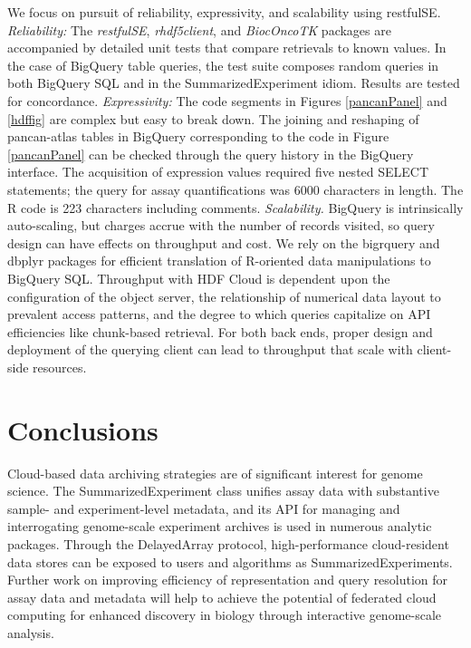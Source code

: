 \documentclass[applications]{gen-bioinformatics}
\newcommand{\Rpackage}[1]{{\textit{#1}}}
\begin{document}
We focus on pursuit of reliability,
expressivity, and scalability using restfulSE.  
\textit{Reliability:} 
The \Rpackage{restfulSE}, \Rpackage{rhdf5client},
and \Rpackage{BiocOncoTK} packages are accompanied by detailed unit
tests that compare retrievals to known values.  In the
case of BigQuery table queries, the test
suite composes random queries 
in both BigQuery SQL and in the SummarizedExperiment idiom.  Results
are tested for concordance.  \textit{Expressivity:} The code
segments in Figures \ref{pancanPanel} and \ref{hdffig} are
complex but easy to break down.  The joining and
reshaping of pancan-atlas tables in BigQuery corresponding
to the code in Figure \ref{pancanPanel}
can be checked through the query history in the BigQuery
interface.  The acquisition of expression values required
five nested SELECT statements; the query for assay quantifications
was 6000 characters in length.
The R code is 223 characters including comments.
\textit{Scalability.}  BigQuery is intrinsically auto-scaling,
but charges accrue with the number of records visited, 
so query design can have effects on throughput
and cost.  We rely on the bigrquery and dbplyr packages for
efficient translation of R-oriented data manipulations to 
BigQuery SQL.  Throughput with HDF Cloud 
is dependent upon the configuration of the object server,
the relationship of numerical data layout to prevalent access
patterns, and the degree to which queries capitalize on
API efficiencies like chunk-based retrieval.  For both
back ends, proper design and deployment of the querying client can
lead to throughput that scale with client-side resources.

\section*{Conclusions}

Cloud-based data archiving strategies are of significant
interest for genome science.  The SummarizedExperiment class
unifies assay data with substantive sample- and experiment-level
metadata, and its API for managing and interrogating
genome-scale experiment archives is used in numerous
analytic packages.  Through the DelayedArray protocol, high-performance
cloud-resident data stores can be exposed to users and
algorithms as SummarizedExperiments.  Further work on improving
efficiency of
representation and query resolution for assay data and metadata
will help to achieve the potential of federated cloud computing for
enhanced discovery in biology through interactive genome-scale analysis.
\end{document}
